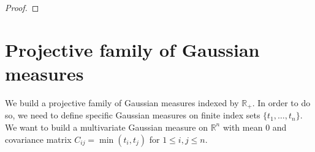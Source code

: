 \begin{proof}\leanok

\end{proof}


\section{Projective family of Gaussian measures}

We build a projective family of Gaussian measures indexed by $\mathbb{R}_+$.
In order to do so, we need to define specific Gaussian measures on finite index sets $\{t_1, \ldots, t_n\}$.
We want to build a multivariate Gaussian measure on $\mathbb{R}^n$ with mean $0$ and covariance matrix $C_{ij} = \min(t_i, t_j)$ for $1 \leq i,j \leq n$.







